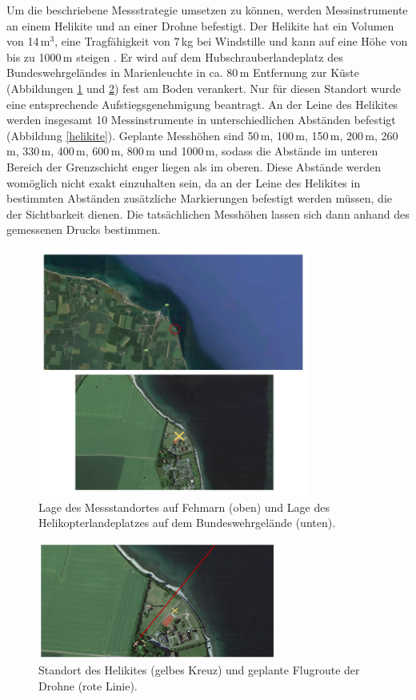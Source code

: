 \documentclass[a4paper,11pt,DIV=calc,tablecaptionabove,headinclude,twoside]{article}
\begin{document}
Um die beschriebene Messstrategie umsetzen zu können, werden Messinstrumente an einem Helikite und an einer Drohne befestigt. Der Helikite hat ein Volumen von 14\,$\text{m}^{3}$, eine Tragfähigkeit von 7\,kg bei Windstille  
und kann auf eine Höhe von bis zu 1000\,m steigen \citep{helikite}. Er wird auf dem Hubschrauberlandeplatz des Bundeswehrgeländes in Marienleuchte in ca. 80\,m Entfernung zur Küste (Abbildungen \ref{messwiese} und \ref{flugroute_oben}) fest am Boden verankert. Nur für diesen Standort wurde eine entsprechende Aufstiegsgenehmigung beantragt. An der Leine des Helikites werden insgesamt 10 Messinstrumente in unterschiedlichen Abständen befestigt (Abbildung \ref{helikite}). Geplante Messhöhen sind 50\,m, 100\,m, 150\,m, 200\,m, 260\,m, 330\,m, 400\,m, 600\,m, 800\,m und 1000\,m, sodass die Abstände im unteren Bereich der Grenzschicht enger liegen als im oberen. Diese Abstände werden womöglich nicht exakt einzuhalten sein, da an der Leine des Helikites in bestimmten Abständen zusätzliche Markierungen befestigt werden müssen, die der Sichtbarkeit dienen. Die tatsächlichen Messhöhen lassen sich dann anhand des gemessenen Drucks bestimmen.
\begin{figure}[t]
\centering
\includegraphics[width=0.8\textwidth]{Messwiese.png}
\captionsetup{width=11cm}
\caption{Lage des Messstandortes auf Fehmarn (oben) und Lage des Helikopterlandeplatzes auf dem Bundeswehrgelände (unten).}
\label{messwiese}
\end{figure}
\begin{figure}[t]
\centering
\includegraphics[width=0.7\textwidth]{Flugroute_oben.png}
\captionsetup{width=11cm}
\caption{Standort des Helikites (gelbes Kreuz) und geplante Flugroute der Drohne (rote Linie).}
\label{flugroute_oben}
\end{figure}
\end{document}
